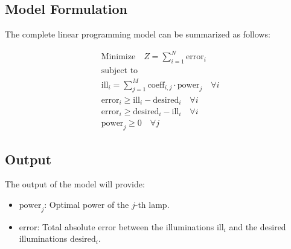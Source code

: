 \documentclass{article}
\begin{document}
\subsection*{Model Formulation}
The complete linear programming model can be summarized as follows:

\[
\begin{aligned}
    & \text{Minimize} \quad Z = \sum_{i=1}^{N} \text{error}_i \\
    & \text{subject to} \\
    & \text{ill}_i = \sum_{j=1}^{M} \text{coeff}_{i,j} \cdot \text{power}_j \quad \forall i \\
    & \text{error}_i \geq \text{ill}_i - \text{desired}_i \quad \forall i \\
    & \text{error}_i \geq \text{desired}_i - \text{ill}_i \quad \forall i \\
    & \text{power}_j \geq 0 \quad \forall j
\end{aligned}
\]

\subsection*{Output}
The output of the model will provide:
\begin{itemize}
    \item \( \text{power}_j \): Optimal power of the \( j \)-th lamp.
    \item \( \text{error} \): Total absolute error between the illuminations \( \text{ill}_i \) and the desired illuminations \( \text{desired}_i \).
\end{itemize}
\end{document}
